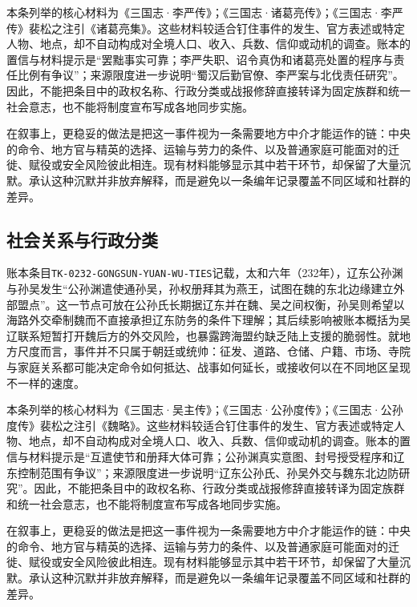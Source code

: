 本条列举的核心材料为《三国志·李严传》；《三国志·诸葛亮传》；《三国志·李严传》裴松之注引《诸葛亮集》。这些材料较适合钉住事件的发生、官方表述或特定人物、地点，却不自动构成对全境人口、收入、兵数、信仰或动机的调查。账本的置信与材料提示是“罢黜事实可靠；李严失职、诏令真伪和诸葛亮处置的程序与责任比例有争议”；来源限度进一步说明“蜀汉后勤官僚、李严案与北伐责任研究”。因此，不能把条目中的政权名称、行政分类或战报修辞直接转译为固定族群和统一社会意志，也不能将制度宣布写成各地同步实施。

在叙事上，更稳妥的做法是把这一事件视为一条需要地方中介才能运作的链：中央的命令、地方官与精英的选择、运输与劳力的条件、以及普通家庭可能面对的迁徙、赋役或安全风险彼此相连。现有材料能够显示其中若干环节，却保留了大量沉默。承认这种沉默并非放弃解释，而是避免以一条编年记录覆盖不同区域和社群的差异。

\subsection{社会关系与行政分类}

账本条目\texttt{TK-0232-GONGSUN-YUAN-WU-TIES}记载，太和六年（232年），辽东公孙渊与孙吴发生“公孙渊遣使通孙吴，孙权册拜其为燕王，试图在魏的东北边缘建立外部盟点”。这一节点可放在公孙氏长期据辽东并在魏、吴之间权衡，孙吴则希望以海路外交牵制魏而不直接承担辽东防务的条件下理解；其后续影响被账本概括为吴辽联系短暂打开魏后方的外交风险，也暴露跨海盟约缺乏陆上支援的脆弱性。就地方尺度而言，事件并不只属于朝廷或统帅：征发、道路、仓储、户籍、市场、寺院与家庭关系都可能决定命令如何抵达、战事如何延长，或接收何以在不同地区呈现不一样的速度。

本条列举的核心材料为《三国志·吴主传》；《三国志·公孙度传》；《三国志·公孙度传》裴松之注引《魏略》。这些材料较适合钉住事件的发生、官方表述或特定人物、地点，却不自动构成对全境人口、收入、兵数、信仰或动机的调查。账本的置信与材料提示是“互遣使节和册拜大体可靠；公孙渊真实意图、封号授受程序和辽东控制范围有争议”；来源限度进一步说明“辽东公孙氏、孙吴外交与魏东北边防研究”。因此，不能把条目中的政权名称、行政分类或战报修辞直接转译为固定族群和统一社会意志，也不能将制度宣布写成各地同步实施。

在叙事上，更稳妥的做法是把这一事件视为一条需要地方中介才能运作的链：中央的命令、地方官与精英的选择、运输与劳力的条件、以及普通家庭可能面对的迁徙、赋役或安全风险彼此相连。现有材料能够显示其中若干环节，却保留了大量沉默。承认这种沉默并非放弃解释，而是避免以一条编年记录覆盖不同区域和社群的差异。

